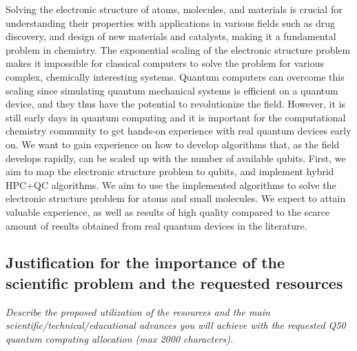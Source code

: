 \documentclass[english,a4paper,12pt]{article}
\begin{document}
Solving the electronic structure of atoms, molecules, and materials is crucial for understanding their properties with applications in various fields such as drug discovery, and design of new materials and catalysts, making it a fundamental problem in chemistry. The exponential scaling of the electronic structure problem makes it impossible for classical computers to solve the problem for various complex, chemically interesting systems. Quantum computers can overcome this scaling since simulating quantum mechanical systems is efficient on a quantum device, and they thus have the potential to revolutionize the field. However, it is still early days in quantum computing and it is important for the computational chemistry community to get hands-on experience with real quantum devices early on. We want to gain experience on how to develop algorithms that, as the field develops rapidly, can be scaled up with the number of available qubits. First, we aim to map the electronic structure problem to qubits, and implement hybrid HPC+QC algorithms. We aim to use the implemented algorithms to solve the electronic structure problem for atoms and small molecules. We expect to attain valuable experience, as well as results of high quality compared to the scarce amount of results obtained from real quantum devices in the literature.

\subsection{Justification for the importance of the scientific problem and the requested resources}

\emph{Describe the proposed utilization of the resources and the main scientific/technical/educational advances you will achieve with the requested Q50 quantum computing allocation (max 2000 characters).}
\end{document}

